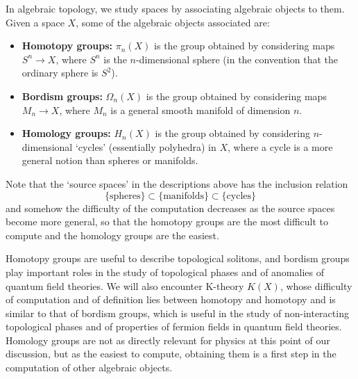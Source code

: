 \documentclass[12pt]{article}
\numberwithin{equation}{section}
\numberwithin{figure}{section}
\theoremstyle{remark}
\begin{document}
In algebraic topology, we study spaces by associating algebraic objects to them.
Given a space $X$, some of the algebraic objects associated are:
\begin{itemize}
\item \textbf{Homotopy groups:} $\pi_n(X)$ is the group obtained by considering maps $S^n \to X$,
where $S^n$ is the $n$-dimensional sphere (in the convention that the ordinary sphere is $S^2$).
\item \textbf{Bordism groups:} $\Omega_n(X)$ is the group obtained by considering maps $M_n \to X$,
where $M_n$ is a general smooth manifold of dimension $n$.
\item \textbf{Homology groups:} $H_n(X)$ is the group obtained by considering $n$-dimensional `cycles' (essentially polyhedra)
 in $X$, where a cycle is a more general notion than spheres or manifolds.
\end{itemize}
Note that the `source spaces' in the descriptions above has the inclusion relation \begin{equation}
  \{\text{spheres}\} \subset \{\text{manifolds}\} \subset \{\text{cycles}\}
\end{equation} and somehow the difficulty of the computation decreases as the source spaces become more general,
so that the homotopy groups are the most difficult to compute and the homology groups are the easiest.

Homotopy groups are useful to describe topological solitons,
and bordism groups play important roles in the study of topological phases
and of anomalies of quantum field theories.
We will also encounter K-theory $K(X)$, whose difficulty of computation and of definition lies between homotopy and homotopy 
and is similar to that of bordism groups, 
which is useful in the study of non-interacting topological phases
and of properties of fermion fields in quantum field theories.
Homology groups are not as directly relevant for physics at this point of our discussion,
but as the easiest to compute, obtaining them is a first step in the computation of other algebraic objects.
\end{document}
